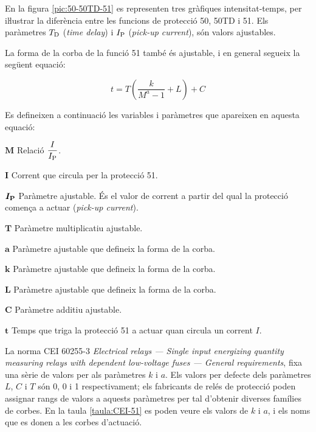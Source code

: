En la figura \vref{pic:50-50TD-51} es representen tres gràfiques intensitat-temps, per iŀlustrar la diferència entre les funcions de protecció 50, 50TD i 51. Els paràmetres $T_\mathrm{D}$ (\textit{time delay}) i $I_\mathrm{P}$ (\textit{pick-up current}), són valors ajustables.
\begin{center}
    
    \label{pic:50-50TD-51}
\end{center}

La forma de la corba de la funció 51 també és ajustable, i en general segueix la següent equació:

\begin{equation}\label{eq:corba-50-51}
  t = T \left( \frac{k}{M^a -1} + L \right) + C
\end{equation}

Es defineixen a continuació les variables i paràmetres que apareixen en aquesta equació:
\begin{list}{}
   {\setlength{\labelwidth}{10mm} \setlength{\leftmargin}{10mm} \setlength{\labelsep}{2mm}}
        \item[$\boldsymbol{M}$] Relació $\dfrac{I}{I_\mathrm{P}}$.
        \item[$\boldsymbol{I}$] Corrent que circula per la protecció 51.
        \item[$\boldsymbol{I_\mathrm{P}}$] Paràmetre ajustable. És el valor de corrent a partir del qual la  protecció comença a actuar (\textit{pick-up current}).
        \item[$\boldsymbol{T}$] Paràmetre multiplicatiu ajustable.
        \item[$\boldsymbol{a}$] Paràmetre ajustable que defineix la forma de la corba.
        \item[$\boldsymbol{k}$] Paràmetre ajustable que defineix la forma de la corba.
        \item[$\boldsymbol{L}$] Paràmetre ajustable que defineix la forma de la corba.
        \item[$\boldsymbol{C}$] Paràmetre additiu ajustable.
        \item[$\boldsymbol{t}$] Temps que triga la protecció 51 a actuar quan circula un corrent $I$.
\end{list}

La norma CEI 60255-3 \textit{Electrical relays --- Single input energizing quantity measuring relays with dependent low-voltage fuses --- General requirements}, fixa una sèrie de valors per als paràmetres $k$ i $a$. Els valors per defecte dels paràmetres $L$, $C$ i $T$ són 0, 0 i 1 respectivament; els fabricants de relés de protecció poden assignar  rangs de valors a aquests paràmetres per tal d'obtenir diverses famílies de corbes. En la taula \vref{taula:CEI-51} es poden veure els valors de $k$ i $a$, i els noms que es donen a les corbes d'actuació.

